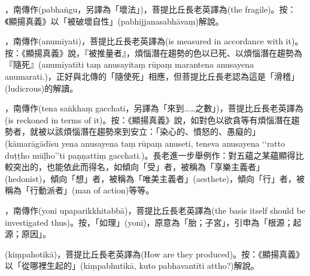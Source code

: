 \startitemgroup[noteitems]
\item{}，南傳作(pabhaṅgu，另譯為「壞法」)，菩提比丘長老英譯為(the fragile)。按：《顯揚真義》以「被破壞自性」(pabhijjanasabhāvaṃ)解說。
\stopitemgroup

\startitemgroup[noteitems]
\item{}，南傳作(anumīyati)，菩提比丘長老英譯為(is measured in accordance with it)。按：《顯揚真義》說，『被推量者』，煩惱潛在趨勢的色以已死、以煩惱潛在趨勢為『隨死』(anumīyatīti taṃ anusayitaṃ rūpaṃ marantena anusayena anumarati.)，正好與北傳的「隨使死」相應，但菩提比丘長老認為這是「滑稽」(ludicrous)的解讀。
\stopitemgroup

\startitemgroup[noteitems]
\item{}，南傳作(tena saṅkhaṃ gacchatī，另譯為「來到……之數」)，菩提比丘長老英譯為(is reckoned in terms of it)。按：《顯揚真義》說，如對色以欲貪等有煩惱潛在趨勢者，就被以該煩惱潛在趨勢來到安立：「染心的、憤怒的、愚癡的」(kāmarāgādīsu yena anusayena taṃ rūpaṃ anuseti, teneva anusayena ‘‘ratto duṭṭho mūḷho’’ti paṇṇattiṃ gacchati.)。長老進一步舉例作：對五蘊之某蘊顯得比較突出的，也能依此而得名，如傾向「受」者，被稱為「享樂主義者」(hedonist)，傾向「想」者，被稱為「唯美主義者」(aesthete)，傾向「行」者，被稱為「行動派者」(man of action)等等。
\stopitemgroup

\startitemgroup[noteitems]
\item{}，南傳作(yoni upaparikkhitabbā)，菩提比丘長老英譯為(the basis itself should be investigated thus)。按，「如理」(yoni)，原意為「胎；子宮」，引申為「根源；起源；原因」。
\stopitemgroup

\startitemgroup[noteitems]
\item{}(kiṃpahotikā)，菩提比丘長老英譯為(How are they produced)。按：《顯揚真義》以「從哪裡生起的」(kiṃpabhutikā, kuto pabhavantīti attho?)解說。
\stopitemgroup

